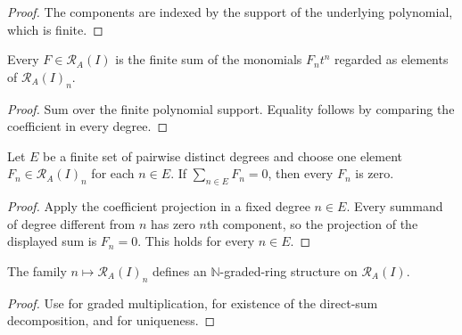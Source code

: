 \begin{proof}
  \leanok
  The components are indexed by the support of the underlying polynomial,
  which is finite.
\end{proof}

\begin{lemma}
  \label{lemma:nagata-rees-sum-components}
  \leanok

  Every $F\in\mathcal R_A(I)$ is the finite sum of the monomials
  $F_nt^n$ regarded as elements of $\mathcal R_A(I)_n$.
\end{lemma}

\begin{proof}
  \leanok
  Sum over the finite polynomial support.  Equality follows by comparing the
  coefficient in every degree.
\end{proof}

\begin{lemma}
  \label{lemma:nagata-rees-components-unique}
  \leanok

  Let $E$ be a finite set of pairwise distinct degrees and choose one element
  $F_n\in\mathcal R_A(I)_n$ for each $n\in E$.  If
  $\sum_{n\in E}F_n=0$, then every $F_n$ is zero.
\end{lemma}

\begin{proof}
  \leanok
  Apply the coefficient projection in a fixed degree $n\in E$.  Every summand
  of degree different from $n$ has zero $n$th component, so the projection of
  the displayed sum is $F_n=0$.  This holds for every $n\in E$.
\end{proof}

\begin{proposition}
  \label{prop:nagata-rees-graded}
  \leanok

  The family $n\mapsto\mathcal R_A(I)_n$ defines an
  $\mathbb N$-graded-ring structure on $\mathcal R_A(I)$.
\end{proposition}

\begin{proof}
  \leanok
  Use  for graded multiplication,
   for existence of the direct-sum
  decomposition, and  for
  uniqueness.
\end{proof}

